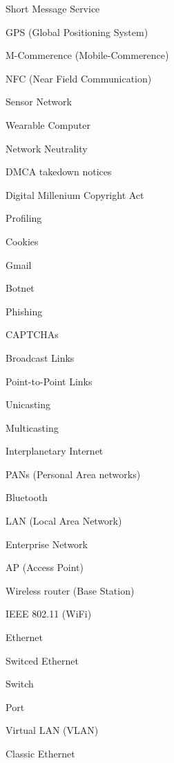\filbreak
\vskip 3mm
Short Message Service

\filbreak
\vskip 3mm
GPS (Global Positioning System)

\filbreak
\vskip 3mm
M-Commerence (Mobile-Commerence)

\filbreak
\vskip 3mm
NFC (Near Field Communication)

\filbreak
\vskip 3mm
Sensor Network

\filbreak
\vskip 3mm
Wearable Computer

\filbreak
\vskip 3mm
Network Neutrality

\filbreak
\vskip 3mm
DMCA takedown notices

\filbreak
\vskip 3mm
Digital Millenium Copyright Act

\filbreak
\vskip 3mm
Profiling

\filbreak
\vskip 3mm
Cookies

\filbreak
\vskip 3mm
Gmail

\filbreak
\vskip 3mm
Botnet

\filbreak
\vskip 3mm
Phishing

\filbreak
\vskip 3mm
CAPTCHAs

\filbreak
\vskip 3mm
Broadcast Links

\filbreak
\vskip 3mm
Point-to-Point Links

\filbreak
\vskip 3mm
Unicasting

\filbreak
\vskip 3mm
Multicasting

\filbreak
\vskip 3mm
Interplanetary Internet

\filbreak
\vskip 3mm
PANs (Personal Area networks)

\filbreak
\vskip 3mm
Bluetooth

\filbreak
\vskip 3mm
LAN (Local Area Network)

\filbreak
\vskip 3mm
Enterprise Network

\filbreak
\vskip 3mm
AP (Access Point)

\filbreak
\vskip 3mm
Wireless router (Base Station)

\filbreak
\vskip 3mm
IEEE 802.11 (WiFi)

\filbreak
\vskip 3mm
Ethernet

\filbreak
\vskip 3mm
Switced Ethernet

\filbreak
\vskip 3mm
Switch

\filbreak
\vskip 3mm
Port

\filbreak
\vskip 3mm
Virtual LAN (VLAN)

\filbreak
\vskip 3mm
Classic Ethernet

